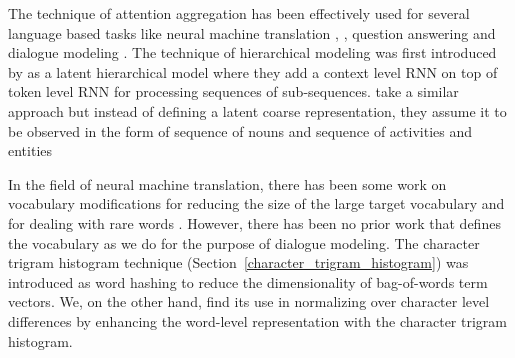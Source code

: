 \documentclass[11pt]{report}
\renewcommand\cite{\citep}	%
\begin{document}
The technique of attention aggregation has been effectively used for several language based tasks like neural machine translation \cite{bahdanau2014neural}, \cite{luong2015effective}, question answering \cite{hermann2015teaching} and dialogue modeling \cite{yao2016attentional}. 
The technique of hierarchical modeling was first introduced by \cite{serban2016hierarchical} as a latent hierarchical model where they add a context level RNN on top of token level RNN for processing sequences of sub-sequences.
\cite{serban2016multiresolution} take a similar approach but instead of defining a latent coarse representation, they assume it to be observed in the form of sequence of nouns and sequence of activities and entities

In the field of neural machine translation, there has been some work on vocabulary modifications for reducing the size of the large target vocabulary \cite{JeanCMB15, mi2016vocabulary} and for dealing with rare words \cite{luong2014addressing, sennrich2015neural}. 
However, there has been no prior work that defines the vocabulary as we do for the purpose of dialogue modeling.
The character trigram histogram technique (Section~\ref{character_trigram_histogram}) was introduced as word hashing \cite{huang2013learning} to reduce the dimensionality of bag-of-words term vectors. We, on the other hand, find its use in normalizing over character level differences by enhancing the word-level representation with the character trigram histogram. 
\end{document}
